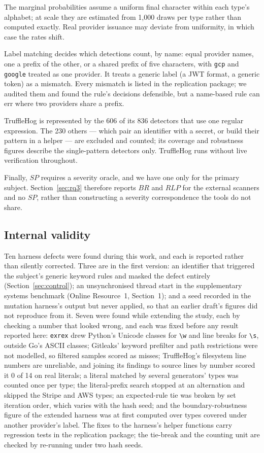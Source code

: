 \documentclass[pdflatex,sn-basic]{sn-jnl}
\begin{document}
The marginal probabilities assume a uniform final character within each type's alphabet; at scale they are estimated from 1{,}000 draws per type rather than computed exactly. Real provider issuance may deviate from uniformity, in which case the rates shift.

Label matching decides which detections count, by name: equal provider names, one a prefix of the other, or a shared prefix of five characters, with \texttt{gcp} and \texttt{google} treated as one provider. It treats a generic label (a JWT format, a generic token) as a mismatch. Every mismatch is listed in the replication package; we audited them and found the rule's decisions defensible, but a name-based rule can err where two providers share a prefix.

TruffleHog is represented by the 606 of its 836 detectors that use one regular expression. The 230 others --- which pair an identifier with a secret, or build their pattern in a helper --- are excluded and counted; its coverage and robustness figures describe the single-pattern detectors only. TruffleHog runs without live verification throughout.

Finally, $SP$ requires a severity oracle, and we have one only for the primary subject. Section~\ref{sec:rq3} therefore reports $BR$ and $RLP$ for the external scanners and no $SP$, rather than constructing a severity correspondence the tools do not share.

\subsection{Internal validity}

Ten harness defects were found during this work, and each is reported rather than silently corrected. Three are in the first version: an identifier that triggered the subject's generic keyword rules and masked the defect entirely (Section~\ref{sec:control}); an unsynchronised thread start in the supplementary systems benchmark (Online Resource~1, Section~1); and a seed recorded in the mutation harness's output but never applied, so that an earlier draft's figures did not reproduce from it. Seven were found while extending the study, each by checking a number that looked wrong, and each was fixed before any result reported here: \texttt{exrex} drew Python's Unicode classes for \verb|\w| and line breaks for \verb|\s|, outside Go's ASCII classes; Gitleaks' keyword prefilter and path restrictions were not modelled, so filtered samples scored as misses; TruffleHog's filesystem line numbers are unreliable, and joining its findings to source lines by number scored it 0 of 14 on real literals; a literal matched by several generators' types was counted once per type; the literal-prefix search stopped at an alternation and skipped the Stripe and AWS types; an expected-rule tie was broken by set iteration order, which varies with the hash seed; and the boundary-robustness figure of the extended harness was at first computed over types covered under another provider's label. The fixes to the harness's helper functions carry regression tests in the replication package; the tie-break and the counting unit are checked by re-running under two hash seeds.
\end{document}
